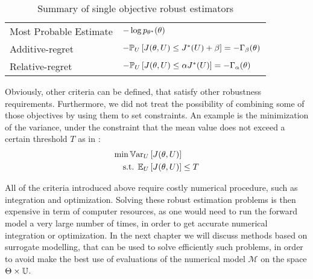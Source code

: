 \documentclass[../../Main_ManuscritThese.tex]{subfiles}
\begin{document}
\begin{table}[ht]
\begin{tabular}{ll}
    Most Probable Estimate        & $-\log p_{\theta^*}(\theta)$                                                                                                 \\
    Additive-regret               & $-\mathbb{P}_{U}\left[J(\theta, U) \leq J^*(U) + \beta \right]=-\Gamma_{\beta}(\theta)$                                     \\
    Relative-regret               & $-\mathbb{P}_{U}\left[J(\theta, U) \leq \alpha J^*(U) \right]=-\Gamma_{\alpha}(\theta) $                                    \\ \bottomrule
  \end{tabular}
  \caption{\label{tab:summary_robust} Summary of single objective robust estimators}
\end{table}
 
Obviously, other criteria can be defined, that satisfy other robustness requirements.
Furthermore, we did not treat the possibility of combining some of those objectives by using them to set constraints. An example is the minimization of  the variance, under the constraint that the mean value does not exceed a certain threshold $T$ as in \cite{lehman_designing_2004}:
\begin{align*}
  \min \mathbb{V}\mathrm{ar}_{U}&\left[J(\theta, U)\right]  \\
  \text{s.t. } \mathbb{E}_{U}&\left[J(\theta, U)\right]   \leq T
\end{align*}

All of the criteria introduced above require costly numerical procedure, such as integration and optimization. Solving these robust estimation problems is then expensive in term of computer resources, as one would need to run the forward model a very large number of times, in order to get accurate numerical integration or optimization. In the next chapter we will discuss methods based on surrogate modelling, that can be used to solve efficiently such problems, in order to avoid make the best use of evaluations of the numerical model $\mathcal{M}$ on the space $\Theta \times\mathbb{U}$. 

\markchapterend
\subfileLocal{
	\pagestyle{empty}
	
	
      }
\end{document}
